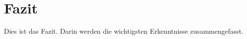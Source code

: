 \section{Fazit} \label{section:fazit}
Dies ist das Fazit. Darin werden die wichtigsten Erkenntnisse zusammengefasst.